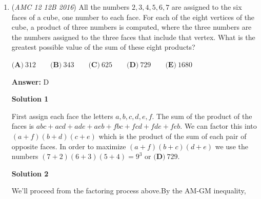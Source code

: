 \begin{enumerate}
 



\textbf{Solution 4 (no AM-GM or Calculus)}

Our sequence is $a_1,1,...$. Since we know this is a converging series, our ratio is in $(0,1)$. Because the 2nd term in the sequence is a 1, the ratio must be $\frac{1}{a_1}$, so we can write $S$ as $\frac{a_1}{1-\frac{1}{a_1}}$. With some manipulation we get $S=\frac{1}{a_1-1}$. Since S has to be a "positive number," we come to think $a_1$ is $2$ (makes S positive & we know a sequence/series of a ratio $1/2$ is definitely convergent). So our sequence is $2,1,1/2,1,4,...$, $2+1+1=\boxed{\textbf{(E)}\ 4}$.-thedodecagon

 



\textbf{Solution 5 (Quadratic formula)}

As in the previous solutions, $S=\frac{1}{r-r^2} \implies Sr^2-Sr+1=0 \implies \text{discriminant}=S^2-4S \ge 0$ since we know that such an $r$ exists. We then have $S \ge 4$ for positive $S,$ and this is achievable when $r=.5,$ so the answer is $4.$



	\item (\textit{AMC 12 12B 2016}) All the numbers $2, 3, 4, 5, 6, 7$ are assigned to the six faces of a cube, one number to each face. For each of the eight vertices of the cube, a product of three numbers is computed, where the three numbers are the numbers assigned to the three faces that include that vertex. What is the greatest possible value of the sum of these eight products?


 $\textbf{(A)}\ 312 \qquad \textbf{(B)}\ 343 \qquad \textbf{(C)}\ 625 \qquad \textbf{(D)}\ 729 \qquad \textbf{(E)}\ 1680$

 \textbf{Answer: }D



\textbf{Solution 1}

First assign each face the letters $a,b,c,d,e,f$. The sum of the product of the faces is $abc+acd+ade+aeb+fbc+fcd+fde+feb$. We can factor this into $(a+f)(b+d)(c+e)$ which is the product of the sum of each pair of opposite faces. In order to maximize $(a+f)(b+c)(d+e)$ we use the numbers $(7+2)(6+3)(5+4) = 9^3$ or $\boxed{\textbf{(D)}\ 729 }$.

 



\textbf{Solution 2}

We'll proceed from the factoring process above.By the AM-GM inequality,


\end{enumerate}
